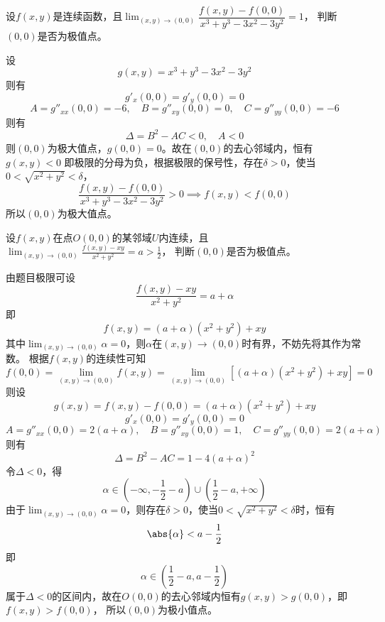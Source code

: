 \begin{example}
    设$f(x,y)$是连续函数，且$\lim_{(x,y)\to(0,0)}\dfrac{f(x,y)-f(0,0)}{x^3+y^3 - 3x^2 - 3y^2} = 1$，
    判断$(0,0)$是否为极值点。
\end{example}
\begin{solution}
    设
    \[ g(x,y) = x^3 + y^3 - 3x^2 -3y^2 \]
    则有
    \[ g'_x(0,0) = g'_y(0,0) = 0 \]
    \[ A = g''_{xx}(0,0) = -6, \quad B = g''_{xy}(0,0) = 0, \quad C = g''_{yy}(0,0) = -6 \]
    则有
    \[\Delta = B^2 - AC < 0, \quad A  < 0 \]
    则$(0,0)$为极大值点，$g(0,0) = 0$。故在$(0,0)$的去心邻域内，恒有$g(x,y)<0$
    即极限的分母为负，根据极限的保号性，存在$\delta > 0$，使当$0 < \sqrt{x^2 + y^2} < \delta$，
    \[
        \frac{f(x,y) - f(0,0)}{x^3 + y^3 - 3x^2 -3y^2} > 0 \implies f(x,y) < f(0,0)
    \]
    所以$(0,0)$为极大值点。
\end{solution}

\begin{example}
    设$f(x,y)$在点$O(0,0)$的某邻域$U$内连续，且$\lim_{(x,y)\to(0,0)}\frac{f(x,y) - xy}{x^2 + y^2} = a > \frac{1}{2}$，
    判断$(0,0)$是否为极值点。
\end{example}
\begin{solution}
    由题目极限可设
    \[ \frac{f(x,y) - xy}{x^2 + y^2} = a + \alpha \]
    即
    \[ f(x,y) = (a + \alpha)(x^2 + y^2) + xy \]
    其中$\lim_{(x,y)\to(0,0)} \alpha = 0$，则$\alpha$在$(x,y)\to(0,0)$时有界，不妨先将其作为常数。
    根据$f(x,y)$的连续性可知
    \[ f(0,0) = \lim_{(x,y)\to(0,0)} f(x,y) = \lim_{(x,y)\to(0,0)} [(a + \alpha)(x^2 + y^2) + xy] = 0 \]
    则设
    \[ g(x,y) = f(x,y) - f(0,0) = (a + \alpha)(x^2 + y^2) + xy \]
    \[ g'_x(0,0) = g'_y(0,0) = 0 \]
    \[ A = g''_{xx}(0,0) = 2(a+\alpha), \quad B=g''_{xy}(0,0) = 1,\quad C = g''_{yy}(0,0) = 2(a+\alpha) \]
    则有
    \[ \Delta = B^2 - AC = 1 - 4(a+\alpha)^2 \]
    令$\Delta < 0$，得
    \[ \alpha \in (-\infty,  - \frac{1}{2} - a) \cup (\frac{1}{2} - a, +\infty) \]
    由于$\lim_{(x,y)\to(0,0)} \alpha = 0$，则存在$\delta > 0$，使当$0<\sqrt{x^2 + y^2}<\delta$时，恒有
    \[ \abs{\alpha} < a - \frac{1}{2} \]
    即
    \[ \alpha \in (\frac{1}{2} - a, a - \frac{1}{2}) \]
    属于$\Delta < 0$的区间内，故在$O(0,0)$的去心邻域内恒有$g(x,y) > g(0,0)$，即$f(x,y) > f(0,0)$，
    所以$(0,0)$为极小值点。
\end{solution}

